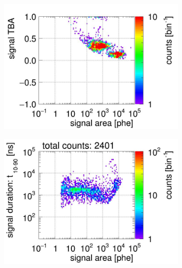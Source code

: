 \begin{landscape}
\begin{figure}[!p]
\begin{subfigure}[t]{0.33\textwidth}
			\includegraphics[width=\figurewidth,clip,trim={0 0 0 40}]{Figures/GasTest/CutsValid/res64767/tbapaX07Vecfig64767.jpg}
			\caption{}
			\label{fig:signal selection 07}
		\end{subfigure}
		\begin{subfigure}[t]{0.33\textwidth}
			\centering
			\includegraphics[width=\figurewidth,clip,trim={0 98 0 0}]{Figures/GasTest/CutsValid/res64767/pdpa08Vecfig64767.jpg}

\end{subfigure}
\end{figure}
\end{landscape}
